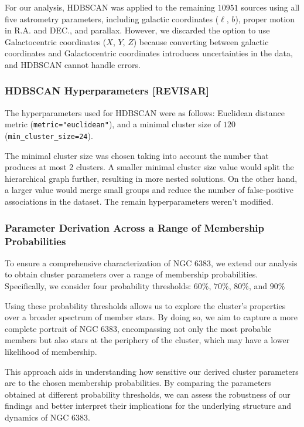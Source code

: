 \documentclass[fleqn,usenatbib,usedcolumn,useAMS]{mnras}
\begin{document}
For our analysis, HDBSCAN was applied to the remaining $10951$ sources using all five astrometry parameters, including galactic coordinates ($\ell$, $b$), proper motion in R.A. and DEC., and parallax. However, we discarded the option to use Galactocentric coordinates ($X$, $Y$, $Z$) because converting between galactic coordinates and Galactocentric coordinates introduces uncertainties in the data, and HDBSCAN cannot handle errors.

\subsubsection{HDBSCAN Hyperparameters [REVISAR]}

The hyperparameters used for HDBSCAN were as follows: Euclidean distance metric (\texttt{metric="euclidean"}), and a minimal cluster size of $120$ (\texttt{min\_cluster\_size=24}).

The minimal cluster size was chosen taking into account the number that produces at most 2 clusters.  A smaller minimal cluster size value would split the hierarchical graph further, resulting in more nested solutions. On the other hand, a larger value would merge small groups and reduce the number of false-positive associations in the dataset. The remain hyperparameters weren't modified.

\subsubsection{Parameter Derivation Across a Range of Membership Probabilities}

To ensure a comprehensive characterization of NGC 6383, we extend our analysis to obtain cluster parameters over a range of membership probabilities. Specifically, we consider four probability thresholds: $60\%$, $70\%$, $80\%$, and $90\%$

Using these probability thresholds allows us to explore the cluster's properties over a broader spectrum of member stars. By doing so, we aim to capture a more complete portrait of NGC 6383, encompassing not only the most probable members but also stars at the periphery of the cluster, which may have a lower likelihood of membership.

This approach aids in understanding how sensitive our derived cluster parameters are to the chosen membership probabilities. By comparing the parameters obtained at different probability thresholds, we can assess the robustness of our findings and better interpret their implications for the underlying structure and dynamics of NGC 6383.
\end{document}
